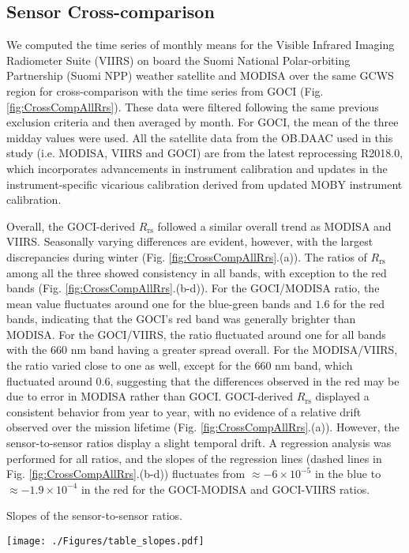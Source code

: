 \documentclass[]{interact}
\theoremstyle{plain}%
\theoremstyle{definition}
\theoremstyle{remark}
\begin{document}
\subsection{Sensor Cross-comparison}

We computed the time series of monthly means for the Visible Infrared Imaging Radiometer Suite (VIIRS) on board the Suomi National Polar-orbiting Partnership (Suomi NPP) weather satellite \citep{Wang2014} and MODISA over the same GCWS region for cross-comparison with the time series from GOCI (Fig. \ref{fig:CrossCompAllRrs}). These data were filtered following the same previous exclusion criteria and then averaged by month. For GOCI, the mean of the three midday values were used. All the satellite data from the OB.DAAC used in this study (i.e. MODISA, VIIRS and GOCI) are from the latest reprocessing R2018.0, which incorporates advancements in instrument calibration and updates in the instrument-specific vicarious calibration derived from updated MOBY instrument calibration.

Overall, the GOCI-derived $R_\text{rs}$ followed a similar overall trend as MODISA and VIIRS.  Seasonally varying differences are evident, however, with the largest discrepancies during winter (Fig. \ref{fig:CrossCompAllRrs}.(a)). The ratios of $R_\text{rs}$ among all the three showed consistency in all bands, with exception to the red bands (Fig. \ref{fig:CrossCompAllRrs}.(b-d)). For the GOCI/MODISA ratio, the mean value fluctuates around one for the blue-green bands and $1.6$ for the red bands, indicating that the GOCI's red band was generally brighter than MODISA. For the GOCI/VIIRS, the ratio fluctuated around one for all bands with the 660 nm band having a greater spread overall. For the MODISA/VIIRS, the ratio varied close to one as well, except for the 660 nm band, which fluctuated around 0.6, suggesting that the differences observed in the red may be due to error in MODISA rather than GOCI. GOCI-derived $R_\text{rs}$ displayed a consistent behavior from year to year, with no evidence of a relative drift observed over the mission lifetime (Fig. \ref{fig:CrossCompAllRrs}.(a)). However, the sensor-to-sensor ratios display a slight temporal drift. A regression analysis was performed for all ratios, and the slopes of the regression lines (dashed lines in Fig. \ref{fig:CrossCompAllRrs}.(b-d)) fluctuates from $\approx-6\times10^{-5}$ in the blue to $\approx-1.9\times10^{-4}$ in the red for the GOCI-MODISA and GOCI-VIIRS ratios.
\begin{table}[htbp!]
\caption{Slopes of the sensor-to-sensor ratios. \label{tab:slopes}}

  \centering
    \texttt{[image: ./Figures/table\_slopes.pdf]}

\end{table}
\end{document}
